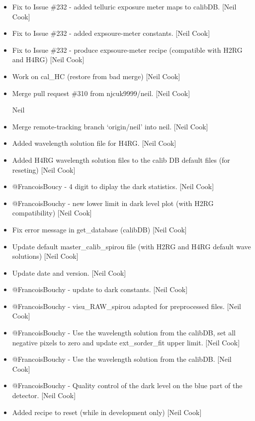 \documentclass[a4paper,10pt,english]{report}
\begin{document}
\begin{itemize}
\item {} 
Fix to Issue \#232 - added telluric exposure meter maps to calibDB.
{[}Neil Cook{]}

\item {} 
Fix to Issue \#232 - added expsoure-meter constants. {[}Neil Cook{]}

\item {} 
Fix to Issue \#232 - produce expsoure-meter recipe (compatible with
H2RG and H4RG) {[}Neil Cook{]}

\item {} 
Work on cal\_HC (restore from bad merge) {[}Neil Cook{]}

\item {} 
Merge pull request \#310 from njcuk9999/neil. {[}Neil Cook{]}

Neil

\item {} 
Merge remote-tracking branch ‘origin/neil’ into neil. {[}Neil Cook{]}

\item {} 
Added wavelength solution file for H4RG. {[}Neil Cook{]}

\item {} 
Added H4RG wavelength solution files to the calib DB default files
(for reseting) {[}Neil Cook{]}

\item {} 
@FrancoisBoucy - 4 digit to diplay the dark statistics. {[}Neil Cook{]}

\item {} 
@FrancoisBouchy - new lower limit in dark level plot (with H2RG
compatibility) {[}Neil Cook{]}

\item {} 
Fix error message in get\_database (calibDB) {[}Neil Cook{]}

\item {} 
Update default master\_calib\_spirou file (with H2RG and H4RG default
wave solutions) {[}Neil Cook{]}

\item {} 
Update date and version. {[}Neil Cook{]}

\item {} 
@FrancoisBouchy - update to dark constants. {[}Neil Cook{]}

\item {} 
@FrancoisBouchy - visu\_RAW\_spirou adapted for preprocessed files.
{[}Neil Cook{]}

\item {} 
@FrancoisBouchy - Use the wavelength solution from the calibDB, set
all negative pixels to zero and update ext\_sorder\_fit upper limit.
{[}Neil Cook{]}

\item {} 
@FrancoisBouchy - Use the wavelength solution from the calibDB. {[}Neil
Cook{]}

\item {} 
@FrancoisBouchy - Quality control of the dark level on the blue part
of the detector. {[}Neil Cook{]}

\item {} 
Added recipe to reset (while in development only) {[}Neil Cook{]}

\end{itemize}
\end{document}
